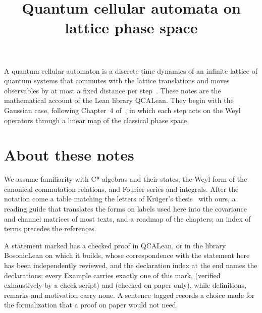 \documentclass[11pt]{article}
\title{Quantum cellular automata on lattice phase space}
\author{}
\date{}
\numberwithin{equation}{section}
\newcommand{\motiv}[1]{#1}
\theoremstyle{definition}
\theoremstyle{remark}
\theoremstyle{plain}
\newcommand{\reve}[1]{#1}
\newcommand{\revs}[1]{#1}
\begin{document}
\QCAEnableLinks
\sloppy
\maketitle
\vspace{-2em}
\noindent\motiv{\reve{A quantum cellular automaton is a discrete-time dynamics of an infinite
lattice of quantum systems that commutes with the lattice translations and moves observables by
at most a fixed distance per step~\cite{schumacher-werner}. These notes are the mathematical
account of the Lean library QCALean. They begin with the Gaussian case, following Chapter~4
of~\cite{krueger}, in which each step acts on the Weyl operators through a linear map of the
classical phase space.}}

{\small\tableofcontents}
\medskip

\section*{About these notes}
\noindent\motiv{\revs{We assume familiarity with C*-algebras and their states, the Weyl form of
the canonical commutation relations, and Fourier series and integrals. After the notation come a
table matching the letters of Kr\"uger's thesis~\cite{krueger} with ours, a reading guide that
translates the forms on labels used here into the covariance and channel matrices of most texts,
and a roadmap of the chapters; an index of terms precedes the references.}}

\medskip
\noindent\motiv{\revs{A statement marked \QCALeanTag{} has a checked proof in QCALean, or in the
library BosonicLean on which it builds, whose correspondence with the statement here has been
independently reviewed, and the declaration index at the end names the declarations; every
Example carries exactly one of this mark, \QCAScriptTag{} (verified exhaustively by a check
script) and \QCAPaperTag{} (checked on paper only), while definitions, remarks and motivation carry
none. A sentence tagged \QCAArtefactTag{} records a choice made for the formalization that a
proof on paper would not need.}}
\end{document}
